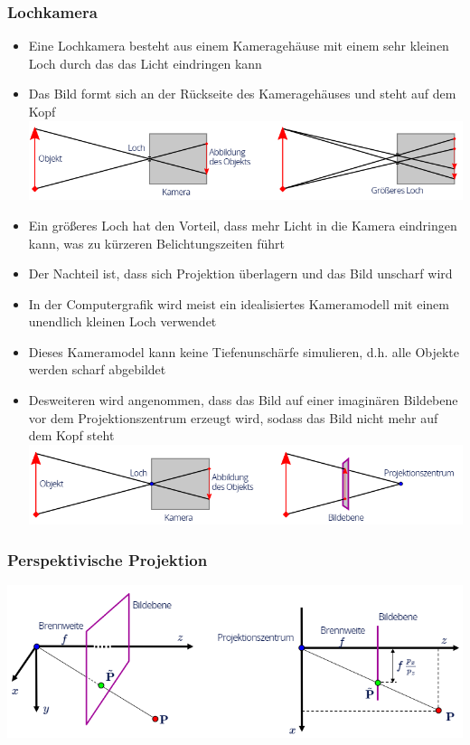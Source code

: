 \documentclass{scrartcl}
\begin{document}
\subsubsection{Lochkamera}

\begin{itemize}
	\item Eine Lochkamera besteht aus einem Kameragehäuse mit einem sehr kleinen Loch durch das das Licht eindringen kann
	\item Das Bild formt sich an der Rückseite des Kameragehäuses und steht auf dem Kopf \\
	\includegraphics[scale=0.5]{figures/pinhole1.png}
	\item Ein größeres Loch hat den Vorteil, dass mehr Licht in die Kamera eindringen kann, was zu kürzeren Belichtungszeiten führt
	\item Der Nachteil ist, dass sich Projektion überlagern und das Bild unscharf wird
	\item In der Computergrafik wird meist ein idealisiertes Kameramodell mit einem unendlich kleinen Loch verwendet
	\item Dieses Kameramodel kann keine Tiefenunschärfe simulieren, d.h. alle Objekte werden scharf abgebildet
	\item Desweiteren wird angenommen, dass das Bild auf einer imaginären Bildebene vor dem Projektionszentrum erzeugt wird, sodass das Bild nicht mehr auf dem Kopf steht \\
	\includegraphics[scale=0.5]{figures/pinhole2.png}
\end{itemize}

\subsubsection{Perspektivische Projektion}

\includegraphics[scale=0.5]{figures/projection.png}
\end{document}
